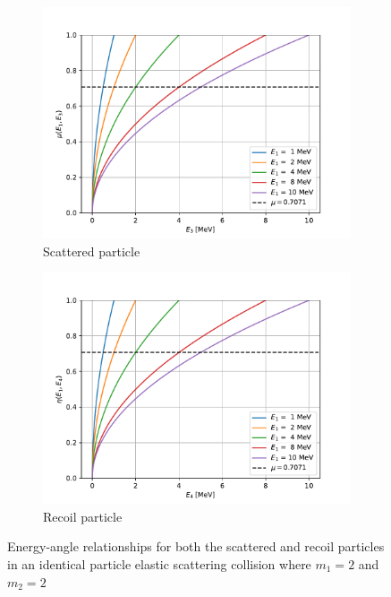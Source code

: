 \documentclass[../main.tex]{subfiles}
\begin{document}
\begin{figure}[!htb]
  \centering
  \begin{subfigure}{.5\textwidth}
    \centering
    \includegraphics[width=\linewidth]{../figures/particle_kinematics/identical_energy_angle.pdf}
    \caption{Scattered particle}
    \label{fig:identical-elastic-energy-angle-scattered}
  \end{subfigure}%
  \begin{subfigure}{.5\textwidth}
    \centering
    \includegraphics[width=\linewidth]{../figures/particle_kinematics/identical_recoil_energy_angle.pdf}
    \caption{Recoil particle}
    \label{fig:identical-elastic-energy-angle-recoil}
  \end{subfigure}
  \caption{Energy-angle relationships for both the scattered and recoil particles in an identical particle elastic scattering collision where $m_1 = 2$ and $m_2 = 2$}
  \label{fig:identical-elastic-energy-angle}
\end{figure}
\end{document}
